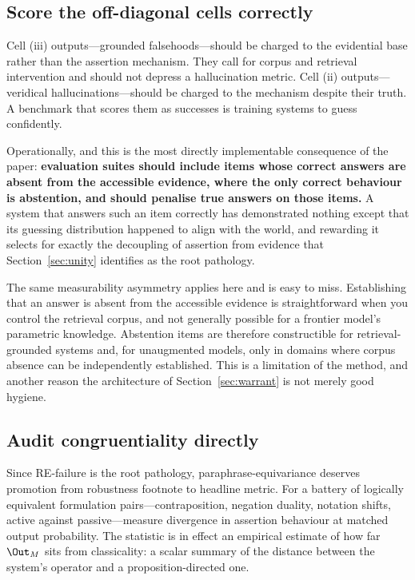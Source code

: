 \subsection{Score the off-diagonal cells correctly}
\label{sec:score-cells}

Cell (iii) outputs---grounded falsehoods---should be charged to the evidential
base rather than the assertion mechanism. They call for corpus and retrieval
intervention and should not depress a hallucination metric. Cell (ii)
outputs---veridical hallucinations---should be charged to the mechanism despite
their truth. A benchmark that scores them as successes is training systems to
guess confidently.

Operationally, and this is the most directly implementable consequence of the
paper: \textbf{evaluation suites should include items whose correct answers are
absent from the accessible evidence, where the only correct behaviour is
abstention, and should penalise true answers on those items.} A system that
answers such an item correctly has demonstrated nothing except that its guessing
distribution happened to align with the world, and rewarding it selects for
exactly the decoupling of assertion from evidence that
Section~\ref{sec:unity} identifies as the root pathology.

The same measurability asymmetry applies here and is easy to miss. Establishing
that an answer is absent from the accessible evidence is straightforward when you
control the retrieval corpus, and not generally possible for a frontier model's
parametric knowledge. Abstention items are therefore constructible for
retrieval-grounded systems and, for unaugmented models, only in domains where
corpus absence can be independently established. This is a limitation of the
method, and another reason the architecture of
Section~\ref{sec:warrant} is not merely good hygiene.

\subsection{Audit congruentiality directly}
\label{sec:re-audit}

Since RE-failure is the root pathology, paraphrase-equivariance deserves promotion
from robustness footnote to headline metric. For a battery of logically equivalent
formulation pairs---contraposition, negation duality, notation shifts, active
against passive---measure divergence in assertion behaviour at matched output
probability. The statistic is in effect an empirical estimate of how far $\Out_M$
sits from classicality: a scalar summary of the distance between the system's
operator and a proposition-directed one.

